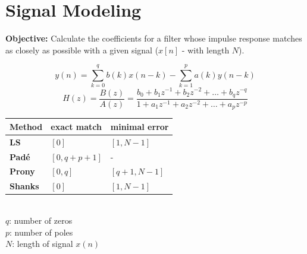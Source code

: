 \vspace{1em}
\begin{minipage}[t]{11cm}
  \vspace{-1.7cm}
  \section{Signal Modeling }
  \textbf{Objective: } Calculate the coefficients for a filter whose
  impulse response matches as closely as possible with a given signal ($x[n]$ - with
  length $N$).

      $$ y(n) = \sum\limits_{k=0}^{q} b(k)x(n-k) - \sum\limits_{k=1}^{p} a(k)y(n-k)$$
      $$ H(z) = \dfrac{B(z)}{A(z)} = \dfrac{b_0 + b_1z^{-1} + b_2 z^{-2} + \dots +
      b_q z^{-q}}{1 + a_1z^{-1} + a_2 z^{-2} + \dots + a_p z^{-p}} $$ 

\end{minipage}
\hfill
\begin{minipage}{7.2cm}
	\vspace{3mm}
	\begin{tabular}{| p{1.4cm} | p{2cm} | p{2.2cm} | }
	    \hline
	    \textbf{Method}
	    & exact match
	    & minimal error \\
	    \hline
	    \hline
	    \textbf{LS} 
	    & $[0]$
	    & $[1, N - 1]$\\
	    \hline
	    \textbf{Padé} 
	    & $[0, q + p + 1]$
	    & -\\
	    \hline
	    \textbf{Prony} 
	    & $[0, q]$
	    & $[q + 1, N - 1]$ \\
	    \hline
	    \textbf{Shanks} 
	    & $[0]$
	    & $[1, N - 1]$\\
	    \hline
	\end{tabular}\\
	$q$: number of zeros\\
	$p$: number of poles\\
	$N$: length of signal $x(n)$
\end{minipage}

